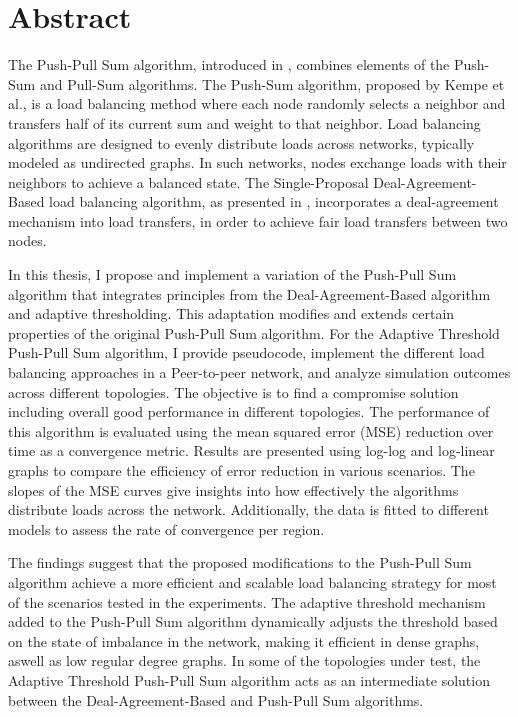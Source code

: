 \chapter*{Abstract}

The Push-Pull Sum algorithm, introduced in \cite{nugroho2023PushPullSumDataAg}, combines elements of the Push-Sum \cite{kempe2003gossipbasedComp} and Pull-Sum algorithms. The Push-Sum algorithm, proposed by Kempe et al., is a load balancing method where each node randomly selects a neighbor and transfers half of its current sum and weight to that neighbor. Load balancing algorithms are designed to evenly distribute loads across networks, typically modeled as undirected graphs. In such networks, nodes exchange loads with their neighbors to achieve a balanced state. The Single-Proposal Deal-Agreement-Based load balancing algorithm, as presented in \cite{Dinitz2023DAB}, incorporates a deal-agreement mechanism into load transfers, in order to achieve fair load transfers between two nodes.

In this thesis, I propose and implement a variation of the Push-Pull Sum algorithm that integrates principles from the Deal-Agreement-Based algorithm and adaptive thresholding. This adaptation modifies and extends certain properties of the original Push-Pull Sum algorithm. For the Adaptive Threshold Push-Pull Sum algorithm, I provide pseudocode, implement the different load balancing approaches in a Peer-to-peer network, and analyze simulation outcomes across different topologies. The objective is to find a compromise solution including overall good performance in different topologies. The performance of this algorithm is evaluated using the mean squared error (MSE) reduction over time as a convergence metric. Results are presented using log-log and log-linear graphs to compare the efficiency of error reduction in various scenarios. The slopes of the MSE curves give insights into how effectively the algorithms distribute loads across the network. Additionally, the data is fitted to different models to assess the rate of convergence per region.

The findings suggest that the proposed modifications to the Push-Pull Sum algorithm achieve a more efficient and scalable load balancing strategy for most of the scenarios tested in the experiments. The adaptive threshold mechanism added to the Push-Pull Sum algorithm dynamically adjusts the threshold based on the state of imbalance in the network, making it efficient in dense graphs, aswell as low regular degree graphs. In some of the topologies under test, the Adaptive Threshold Push-Pull Sum algorithm acts as an intermediate solution between the Deal-Agreement-Based and Push-Pull Sum algorithms.